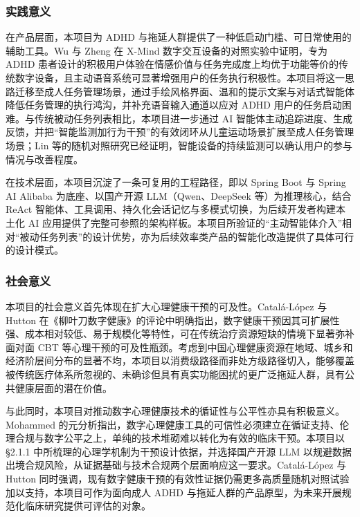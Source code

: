 \subsubsection{实践意义}

\par 在产品层面，本项目为 ADHD 与拖延人群提供了一种低启动门槛、可日常使用的辅助工具。Wu 与 Zheng 在 X-Mind 数字交互设备的对照实验中证明，专为 ADHD 患者设计的积极用户体验在情感价值与任务完成度上均优于功能等价的传统数字设备，且主动语音系统可显著增强用户的任务执行积极性\cite{wu2023xmind}。本项目将这一思路迁移至成人任务管理场景，通过手绘风格界面、温和的提示文案与对话式智能体降低任务管理的执行鸿沟，并补充语音输入通道以应对 ADHD 用户的任务启动困难。与传统被动任务列表相比，本项目进一步通过 AI 智能体主动追踪进度、生成反馈，并把``智能监测加行为干预''的有效闭环从儿童运动场景扩展至成人任务管理场景；Lin 等的随机对照研究已经证明，智能设备的持续监测可以确认用户的参与情况与改善程度\cite{lin2025intelligent}。

\par 在技术层面，本项目沉淀了一条可复用的工程路径，即以 Spring Boot 与 Spring AI Alibaba 为底座、以国产开源 LLM（Qwen、DeepSeek 等）为推理核心，结合 ReAct 智能体、工具调用、持久化会话记忆与多模式切换，为后续开发者构建本土化 AI 应用提供了完整可参照的架构样板。本项目所验证的``主动智能体介入''相对``被动任务列表''的设计优势，亦为后续效率类产品的智能化改造提供了具体可行的设计模式。

\subsubsection{社会意义}

\par 本项目的社会意义首先体现在扩大心理健康干预的可及性。Catalá-López 与 Hutton 在《柳叶刀数字健康》的评论中明确指出，数字健康干预因其可扩展性强、成本相对较低、易于规模化等特性，可在传统治疗资源短缺的情境下显著弥补面对面 CBT 等心理干预的可及性瓶颈\cite{catala2020digital}。考虑到中国心理健康资源在地域、城乡和经济阶层间分布的显著不均，本项目以消费级路径而非处方级路径切入，能够覆盖被传统医疗体系所忽视的、未确诊但具有真实功能困扰的更广泛拖延人群，具有公共健康层面的潜在价值。

\par 与此同时，本项目对推动数字心理健康技术的循证性与公平性亦具有积极意义。Mohammed 的元分析指出，数字心理健康工具的可信性必须建立在循证支持、伦理合规与数字公平之上，单纯的技术堆砌难以转化为有效的临床干预\cite{mohammed2023technology}。本项目以 §2.1.1 中所梳理的心理学机制为干预设计依据，并选择国产开源 LLM 以规避数据出境合规风险，从证据基础与技术合规两个层面响应这一要求。Catalá-López 与 Hutton 同时强调，现有数字健康干预的有效性证据仍需更多高质量随机对照试验加以支持\cite{catala2020digital}，本项目可作为面向成人 ADHD 与拖延人群的产品原型，为未来开展规范化临床研究提供可评估的对象。

